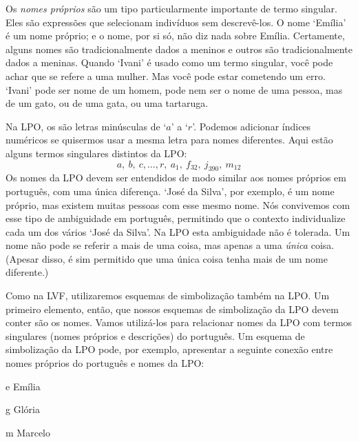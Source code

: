 Os \emph{nomes próprios} são um tipo particularmente importante de termo singular.
Eles são expressões que selecionam indivíduos sem descrevê-los.
O nome `Emília' é um nome próprio; e o nome, por si só, não diz nada sobre Emília.
Certamente, alguns nomes são tradicionalmente dados a meninos e outros são tradicionalmente dados a meninas.
Quando `Ivani' é usado como um termo singular, você pode achar que se refere a uma mulher.
Mas você pode estar cometendo um erro.
`Ivani' pode ser nome de um homem, pode nem ser o nome de uma pessoa, mas de um gato, ou de uma gata, ou uma tartaruga.

Na LPO, os  são letras minúsculas de `$a$' a `$r$'.
Podemos adicionar índices numéricos se quisermos usar a mesma letra para nomes diferentes.
Aqui estão alguns termos singulares distintos da LPO:
	$$a,\ b,\ c,\ldots, r, \ a_1, \ f_{32}, \ j_{390}, \ m_{12}$$
Os nomes da LPO devem ser entendidos de modo similar aos nomes próprios em português, com uma única diferença.
`José da Silva', por exemplo, é um nome próprio, mas existem muitas pessoas com esse mesmo nome.
Nós convivemos com esse tipo de ambiguidade em português, permitindo que o contexto individualize cada um dos vários `José da Silva'.
Na LPO esta ambiguidade não é tolerada.
Um nome não pode se referir a mais de uma coisa, mas apenas a uma \emph{única} coisa.
(Apesar disso, é sim permitido que uma única coisa tenha mais de um nome diferente.)


Como na LVF, utilizaremos esquemas de simbolização também na LPO.
Um primeiro elemento, então, que nossos esquemas de simbolização da LPO devem conter são os nomes.
Vamos utilizá-los para relacionar nomes da LPO com termos singulares (nomes próprios e descrições) do português.
Um esquema de simbolização da LPO pode, por exemplo, apresentar a seguinte conexão entre nomes próprios do português e nomes da LPO:
	\begin{ekey}
		\item[e] Emília
		\item[g] Glória
		\item[m] Marcelo
	\end{ekey}


